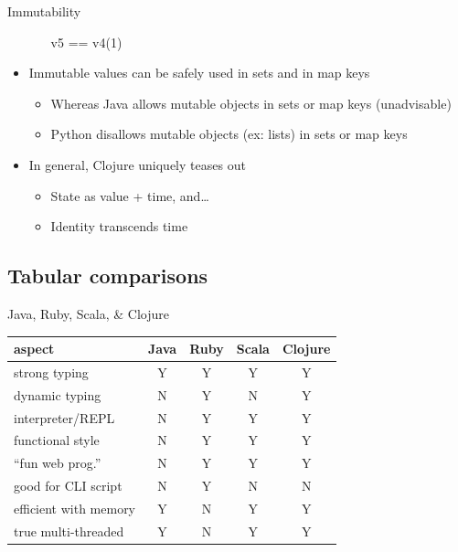 \documentclass{beamer}
\begin{document}
\begin{frame}[allowframebreaks]{Immutability}
\begin{itemize}
\begin{itemize}
{\ttfamily\color{black}
v5 == v4(1)}

    \end{itemize}
  \item Immutable values can be safely used in sets and in map keys
    \begin{itemize}
    \item Whereas Java allows mutable objects in sets or map keys (unadvisable)
    \item Python disallows mutable objects (ex: lists) in sets or map keys
    \end{itemize}
  \item In general, Clojure uniquely teases out
    \begin{itemize}
    \item State as value + time, and\ldots
    \item Identity transcends time
    \end{itemize}
  \end{itemize}
\end{frame}

\subsection{Tabular comparisons}

\begin{frame}{Java, Ruby, Scala, \& Clojure}
  \begin{tabular}{l || c | c | c | c}
    aspect & Java & Ruby & Scala & Clojure\\
    \hline
    \hline
    strong typing & Y & Y & Y & Y\\
    \hline
    dynamic typing & N & Y & N & Y\\
    \hline
    interpreter/REPL & N & Y & Y & Y\\
    \hline
    functional style & N & Y & Y & Y\\
    \hline
    ``fun web prog.'' & N & Y & Y & Y\\
    \hline
    good for CLI script & N & Y & N & N\\
    \hline
    efficient with memory & Y & N & Y & Y\\
    \hline
    true multi-threaded & Y & N & Y & Y\\
  \end{tabular}
\end{frame}
\end{document}
